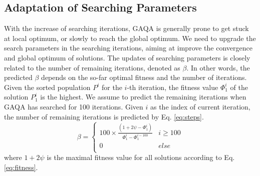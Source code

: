 \documentclass[lettersize,journal]{IEEEtran}
\begin{document}
	\subsection{Adaptation of Searching Parameters}
	With the increase of searching iterations, GAQA is generally prone to get stuck at local optimum, or slowly to reach the global optimum. We need to upgrade the search parameters in the searching iterations, aiming at improve the convergence and global optimum of solutions. The updates of searching parameters is closely related to the number of remaining iterations, denoted as $\beta$. In other words, the predicted $\beta$ depends on the so-far optimal fitness and the number of iterations. Given the sorted population $P^i$ for the $i$-th iteration, the fitness value $\Phi^i_1$ of the solution $P^i_1$ is the highest. We assume to predict the remaining iterations when GAQA has searched for 100 iterations. Given $i$ as the index of current iteration, the number of remaining iterations is predicted by Eq. \ref{eq:steps}.  
	\begin{equation}
		\label{eq:steps}
		\beta=\begin{cases} 100\times\frac{ (1+2\psi-\Phi^i_1)}{\Phi^i_1-\Phi^{i-100}_1}&i \geq 100 \\
			0 & else\\
		\end{cases}
	\end{equation}
	where $1+2\psi$ is the maximal fitness value for all solutions according to Eq. \ref{eq:fitness}.
	
\end{document}
